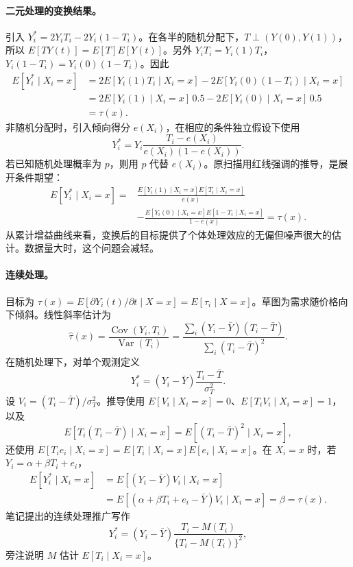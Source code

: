 {\paragraph{二元处理的变换结果。}
引入 $Y_i^*=2Y_iT_i-2Y_i(1-T_i)$。在各半的随机分配下，$T\perp(Y(0),Y(1))$，所以 $E[TY(t)]=E[T]E[Y(t)]$。另外 $Y_iT_i=Y_i(1)T_i$，$Y_i(1-T_i)=Y_i(0)(1-T_i)$。因此
\begin{align*}
E[Y_i^*\mid X_i=x]
&=2E[Y_i(1)T_i\mid X_i=x]-2E[Y_i(0)(1-T_i)\mid X_i=x]\\
&=2E[Y_i(1)\mid X_i=x]\,0.5-2E[Y_i(0)\mid X_i=x]\,0.5\\
&=\tau(x).
\end{align*}
非随机分配时，引入倾向得分 $e(X_i)$，在相应的条件独立假设下使用
\[Y_i^*=Y_i\frac{T_i-e(X_i)}{e(X_i)(1-e(X_i))}.\]
若已知随机处理概率为 $p$，则用 $p$ 代替 $e(X_i)$。原扫描用红线强调的推导，是展开条件期望：
\begin{align*}
E[Y_i^*\mid X_i=x]
={}&\frac{E[Y_i(1)\mid X_i=x]E[T_i\mid X_i=x]}{e(x)}\\
&-\frac{E[Y_i(0)\mid X_i=x]E[1-T_i\mid X_i=x]}{1-e(x)}=\tau(x).
\end{align*}
从累计增益曲线来看，变换后的目标提供了个体处理效应的无偏但噪声很大的估计。数据量大时，这个问题会减轻。

\paragraph{连续处理。}
目标为 $\tau(x)=E[\partial Y_i(t)/\partial t\mid X=x]=E[\tau_i\mid X=x]$。草图为需求随价格向下倾斜。线性斜率估计为
\[\hat\tau(x)=\frac{\operatorname{Cov}(Y_i,T_i)}{\operatorname{Var}(T_i)}
=\frac{\sum_i(Y_i-\bar Y)(T_i-\bar T)}{\sum_i(T_i-\bar T)^2}.
\]
在随机处理下，对单个观测定义
\[Y_i^*=(Y_i-\bar Y)\frac{T_i-\bar T}{\sigma_T^2}.\]
设 $V_i=(T_i-\bar T)/\sigma_T^2$。推导使用 $E[V_i\mid X_i=x]=0$、$E[T_iV_i\mid X_i=x]=1$，以及
\[E[T_i(T_i-\bar T)\mid X_i=x]=E[(T_i-\bar T)^2\mid X_i=x],\]
还使用 $E[T_ie_i\mid X_i=x]=E[T_i\mid X_i=x]E[e_i\mid X_i=x]$。在 $X_i=x$ 时，若 $Y_i=\alpha+\beta T_i+e_i$，
\begin{align*}
E[Y_i^*\mid X_i=x]
&=E[(Y_i-\bar Y)V_i\mid X_i=x]\\
&=E[(\alpha+\beta T_i+e_i-\bar Y)V_i\mid X_i=x]=\beta=\tau(x).
\end{align*}
笔记提出的连续处理推广写作
\[Y_i^*=(Y_i-\bar Y)\frac{T_i-M(T_i)}{\{T_i-M(T_i)\}^2},\]
旁注说明 $M$ 估计 $E[T_i\mid X_i=x]$。

}
